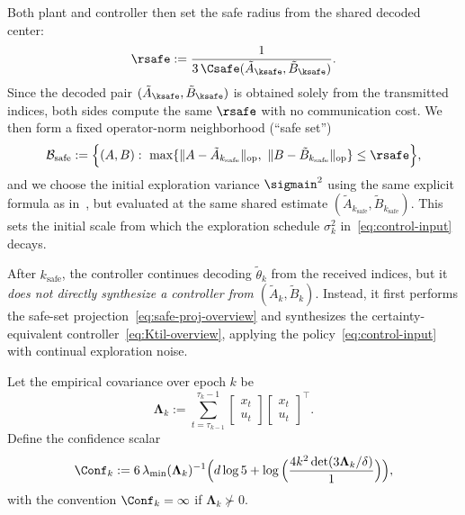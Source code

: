 \documentclass[11pt,journal,onecolumn]{IEEEtran}
\newcommand{\op}{\mathrm{op}}
\begin{document}
Both plant and controller then set the safe radius from the shared decoded center:
\begin{equation}\label{eq:rsafe-def}
    \rsafe := \frac{1}{3\,\Csafe(\tilde A_{\ksafe}, \tilde B_{\ksafe})}.
\end{equation}
Since the decoded pair $(\tilde A_{\ksafe}, \tilde B_{\ksafe})$ is obtained solely from the transmitted indices,
both sides compute the same $\rsafe$ with no communication cost.
We then form a fixed operator-norm neighborhood (``safe set'')
\begin{equation}\label{eq:Bsafe-def}
    \mathcal B_{\mathrm{safe}}
    := \Big\{(A,B):\ \max\{\|A-\tilde A_{k_{\mathrm{safe}}}\|_{\op},\ \|B-\tilde B_{k_{\mathrm{safe}}}\|_{\op}\}\le \rsafe\Big\},
\end{equation}
and we choose the initial exploration variance
\(\sigmain^2\) using the same explicit formula as in~\cite{simchowitz20a}, but evaluated at the
same shared estimate \((\tilde A_{k_{\mathrm{safe}}},\tilde B_{k_{\mathrm{safe}}})\). This sets the initial scale from which the exploration schedule \(\sigma_k^2\) in~\eqref{eq:control-input} decays.

After \(k_{\mathrm{safe}}\), the controller continues decoding \(\tilde\theta_k\) from the received indices,
but it \emph{does not directly synthesize a controller from \((\tilde A_k,\tilde B_k)\)}.
Instead, it first performs the safe-set projection~\eqref{eq:safe-proj-overview} and synthesizes the certainty-equivalent controller~\eqref{eq:Ktil-overview}, applying the policy~\eqref{eq:control-input} with continual exploration noise.

Let the empirical covariance over epoch $k$ be
\begin{equation}\label{eq:Lambda-k}
    \mathbf{\Lambda}_k := \sum_{t=\tau_{k-1}}^{\tau_k-1}
    \begin{bmatrix}x_t\\u_t\end{bmatrix}
    \begin{bmatrix}x_t\\u_t\end{bmatrix}^{\!\top}.
\end{equation}
Define the confidence scalar
\begin{equation}
    \Conf_k :=
    6\,\lambda_{\min}(\mathbf{\Lambda}_k)^{-1}\Big(
    d\log 5 + \log\Big( \frac{4k^2 \det(3\mathbf{\Lambda}_k/\delta)}{1}\Big)
    \Big),
    \label{eq:Conf}
\end{equation}
with the convention $\Conf_k=\infty$ if $\mathbf{\Lambda}_k\not\succ 0$.
\end{document}
